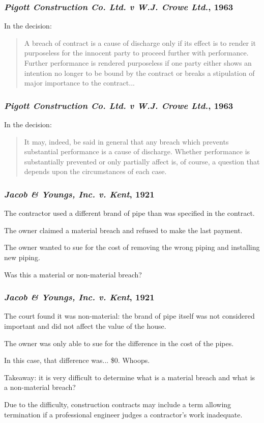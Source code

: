 \begin{frame}
\frametitle{\textit{Pigott Construction Co. Ltd. v W.J. Crowe Ltd.}, 1963 }

In the decision:

\begin{quote}
A breach of contract is a cause of discharge only if its effect is to render it purposeless for the innocent party to proceed further with performance.  Further performance is rendered purposeless if one party either shows an intention no longer to be bound by the contract or breaks a stipulation of major importance to the contract...
\end{quote}

\end{frame}

\begin{frame}
\frametitle{\textit{Pigott Construction Co. Ltd. v W.J. Crowe Ltd.}, 1963 }

In the decision:

\begin{quote}
It may, indeed, be said in general that any breach which prevents substantial performance is a cause of discharge.  Whether performance is substantially prevented or only partially affect is, of course, a question that depends upon the circumstances of each case.\end{quote}


\end{frame}



\begin{frame}
\frametitle{\textit{Jacob \& Youngs, Inc. v. Kent}, 1921}

The contractor used a different brand of pipe than was specified in the contract.

The owner claimed a material breach and refused to make the last payment.

The owner wanted to sue for the cost of removing the wrong piping and installing new piping.

Was this a material or non-material breach?

\end{frame}



\begin{frame}
\frametitle{\textit{Jacob \& Youngs, Inc. v. Kent}, 1921}

The court found it was non-material: the brand of pipe itself was not considered important and did not affect the value of the house.

The owner was only able to sue for the difference in the cost of the pipes.

In this case, that difference was... \$0. Whoops.

Takeaway: it is very difficult to determine what is a material breach and what is a non-material breach?

Due to the difficulty, construction contracts may include a term allowing termination if a professional engineer judges a contractor's work inadequate.

\end{frame}



